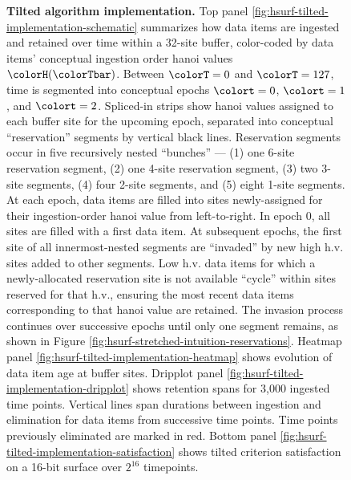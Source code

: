 \begin{figure}[htbp!]
\vspace{-2ex}\caption{%
  \textbf{Tilted algorithm implementation.}
  \footnotesize
  Top panel \ref{fig:hsurf-tilted-implementation-schematic} summarizes how data items are ingested and retained over time within a 32-site buffer, color-coded by data items' conceptual ingestion order hanoi values $\colorH(\colorTbar)$.
  Between $\colorT=0$ and $\colorT=127$, time is segmented into conceptual epochs $\colort=0$, $\colort=1$, and $\colort=2$.
  Spliced-in strips show hanoi values assigned to each buffer site for the upcoming epoch, separated into conceptual ``reservation'' segments by vertical black lines.
  Reservation segments occur in five recursively nested ``bunches'' --- (1) one 6-site reservation segment, (2) one 4-site reservation segment, (3) two 3-site segments, (4) four 2-site segments, and (5) eight 1-site segments.
  At each epoch, data items are filled into sites newly-assigned for their ingestion-order hanoi value from left-to-right.
  In epoch 0, all sites are filled with a first data item.
  At subsequent epochs, the first site of all innermost-nested segments are ``invaded'' by new high h.v. sites added to other segments.
  Low h.v. data items for which a newly-allocated reservation site is not available ``cycle'' within sites reserved for that h.v., ensuring the most recent data items corresponding to that hanoi value are retained.
  The invasion process continues over successive epochs until only one segment remains, as shown in Figure \ref{fig:hsurf-stretched-intuition-reservations}.
  Heatmap panel \ref{fig:hsurf-tilted-implementation-heatmap} shows evolution of data item age at buffer sites.
  Dripplot panel \ref{fig:hsurf-tilted-implementation-dripplot} shows retention spans for 3,000 ingested time points.
  Vertical lines span durations between ingestion and elimination for data items from successive time points.
  Time points previously eliminated are marked in red.
  Bottom panel \ref{fig:hsurf-tilted-implementation-satisfaction} shows tilted criterion satisfaction on a 16-bit surface over $2^{16}$ timepoints.
}
\label{fig:hsurf-tilted-implementation}

\end{figure}

